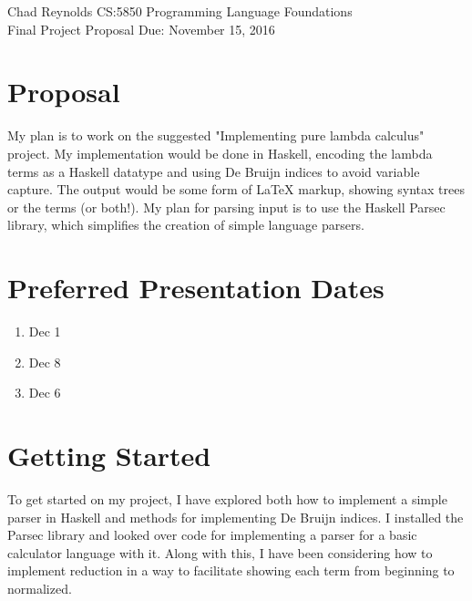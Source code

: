 \documentclass[12pt,oneside]{article}
\begin{document}
Chad Reynolds \hfill 
CS:5850 Programming Language Foundations \\ 
Final Project Proposal \hfill 
Due:  November 15, 2016 \\


\section*{Proposal} 
My plan is to work on the suggested "Implementing pure
lambda calculus" project.  My implementation would be done in Haskell, encoding
the lambda terms as a Haskell datatype and using De Bruijn indices to avoid
variable capture.  The output would be some form of \LaTeX{} markup, showing 
syntax trees or the terms (or both!).  My plan for parsing input is to use the 
Haskell Parsec library, which simplifies the creation of simple 
language parsers.  


\section*{Preferred Presentation Dates} 
\begin{enumerate}
    \item Dec 1
    \item Dec 8
    \item Dec 6
\end{enumerate}

\section*{Getting Started}
To get started on my project, I have explored both how to implement a simple 
parser in Haskell and methods for implementing De Bruijn indices.  I installed 
the Parsec library and looked over code for implementing a parser for a 
basic calculator language with it.  Along with this, I have been considering 
how to implement reduction in a way to facilitate showing each term from 
beginning to normalized.
\end{document}
